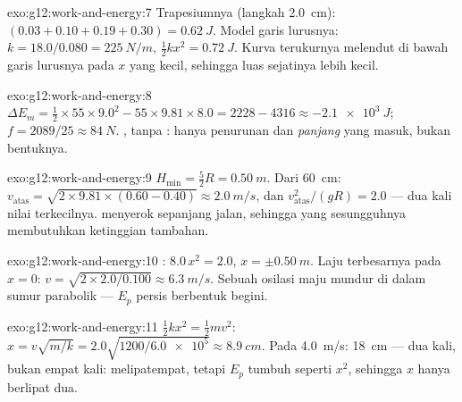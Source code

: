 \begin{solution}{exo:g12:work-and-energy:7}
Trapesiumnya (langkah \qty{2.0}{cm}): $(0.03 + 0.10 + 0.19 + 0.30) =
\qty{0.62}{J}$. Model garis lurusnya: $k = 18.0/0.080 =
\qty{225}{N/m}$, $\tfrac12 kx^2 = \qty{0.72}{J}$. Kurva terukurnya
melendut di bawah garis lurusnya pada $x$ yang kecil, sehingga luas sejatinya
lebih kecil.
\end{solution}

\begin{solution}{exo:g12:work-and-energy:8}
$\Delta E_m = \tfrac12 \times 55 \times 9.0^2 - 55 \times 9.81 \times
8.0 = 2228 - 4316 \approx \qty{-2.1e3}{J}$;
$f = 2089/25 \approx \qty{84}{N}$.  , 
tanpa : hanya penurunan dan \emph{panjang}  yang masuk, bukan
bentuknya.
\end{solution}

\begin{solution}{exo:g12:work-and-energy:9}
$H_{\min} = \tfrac52 R = \qty{0.50}{m}$. Dari \qty{60}{cm}:
$v_{\text{atas}} = \sqrt{2 \times 9.81 \times (0.60 - 0.40)} \approx
\qty{2.0}{m/s}$, dan $v_{\text{atas}}^2/(gR) = 2.0$ --- dua kali
nilai terkecilnya.  menyerok  sepanjang jalan, sehingga 
yang sesungguhnya membutuhkan ketinggian tambahan.
\end{solution}

\begin{solution}{exo:g12:work-and-energy:10}
: $8.0\,x^2 = 2.0$, $x = \pm\qty{0.50}{m}$. Laju
terbesarnya pada $x = 0$: $v = \sqrt{2 \times 2.0/0.100} \approx
\qty{6.3}{m/s}$. Sebuah osilasi maju mundur di dalam sumur parabolik ---
$E_p$  persis berbentuk begini.
\end{solution}

\begin{solution}{exo:g12:work-and-energy:11}
$\tfrac12 kx^2 = \tfrac12 mv^2$:
$x = v\sqrt{m/k} = 2.0\sqrt{1200/\num{6.0e5}} \approx \qty{8.9}{cm}$.
Pada \qty{4.0}{m/s}: \qty{18}{cm} --- dua kali, bukan empat kali: 
melipatempat, tetapi $E_p$ tumbuh seperti $x^2$, sehingga $x$ hanya berlipat dua.
\end{solution}

